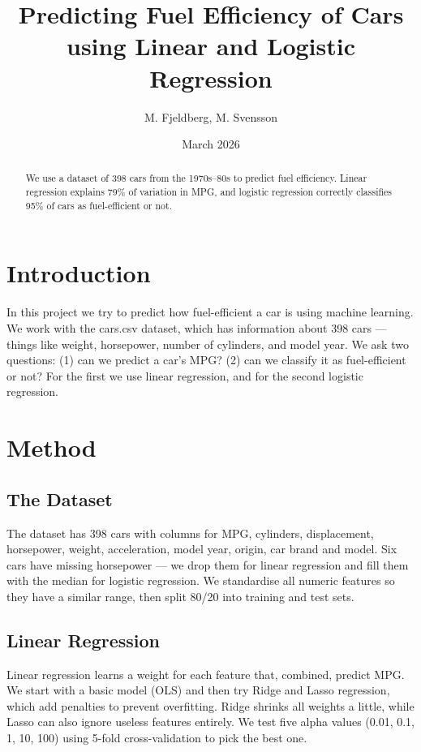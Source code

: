 \documentclass[a4paper, twocolumn]{article}
\title{Predicting Fuel Efficiency of Cars using Linear and Logistic Regression}
\author{M. Fjeldberg, M. Svensson}
\date{March 2026}
\begin{document}
\maketitle

\begin{abstract}
We use a dataset of 398 cars from the 1970s--80s to predict fuel efficiency. Linear regression explains 79\% of variation in MPG, and logistic regression correctly classifies 95\% of cars as fuel-efficient or not.
\end{abstract}

\section{Introduction}

In this project we try to predict how fuel-efficient a car is using machine learning. We work with the cars.csv dataset, which has information about 398 cars --- things like weight, horsepower, number of cylinders, and model year. We ask two questions: (1) can we predict a car's MPG? (2) can we classify it as fuel-efficient or not? For the first we use linear regression, and for the second logistic regression.

\section{Method}

\subsection{The Dataset}

The dataset has 398 cars with columns for MPG, cylinders, displacement, horsepower, weight, acceleration, model year, origin, car brand and model. Six cars have missing horsepower --- we drop them for linear regression and fill them with the median for logistic regression. We standardise all numeric features so they have a similar range, then split 80/20 into training and test sets.

\subsection{Linear Regression}

Linear regression learns a weight for each feature that, combined, predict MPG. We start with a basic model (OLS) and then try Ridge and Lasso regression, which add penalties to prevent overfitting. Ridge shrinks all weights a little, while Lasso can also ignore useless features entirely. We test five alpha values (0.01, 0.1, 1, 10, 100) using 5-fold cross-validation to pick the best one.
\end{document}
